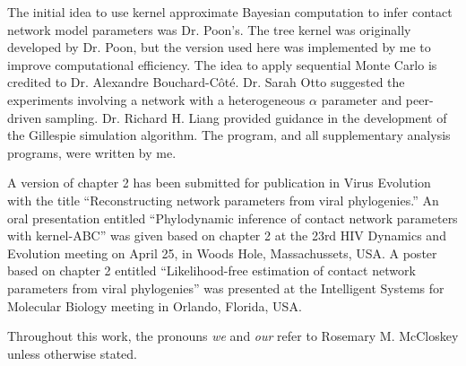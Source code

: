 The initial idea to use kernel approximate Bayesian computation to infer
contact network model parameters was Dr. Poon's. The tree kernel was originally
developed by Dr. Poon, but the version used here was implemented by me to
improve computational efficiency. The idea to apply sequential Monte Carlo is
credited to Dr. Alexandre Bouchard-C\^ot\'e. Dr. Sarah Otto suggested the
experiments involving a network with a heterogeneous $\alpha$ parameter and
peer-driven sampling. Dr. Richard H. Liang provided guidance in the development
of the Gillespie simulation algorithm. The  program, and all
supplementary analysis programs, were written by me.

A version of chapter 2 has been submitted for publication in Virus Evolution
with the title ``Reconstructing network parameters from viral phylogenies.'' An
oral presentation entitled ``Phylodynamic inference of contact network
parameters with kernel-ABC'' was given based on chapter 2 at the 23rd HIV
Dynamics and Evolution meeting on April 25, in Woods Hole, Massachussets, USA.
A poster based on chapter 2 entitled ``Likelihood-free estimation of contact
network parameters from viral phylogenies'' was presented at the Intelligent
Systems for Molecular Biology meeting in Orlando, Florida, USA.

Throughout this work, the pronouns \textit{we} and \textit{our} refer to
Rosemary M. McCloskey unless otherwise stated.
